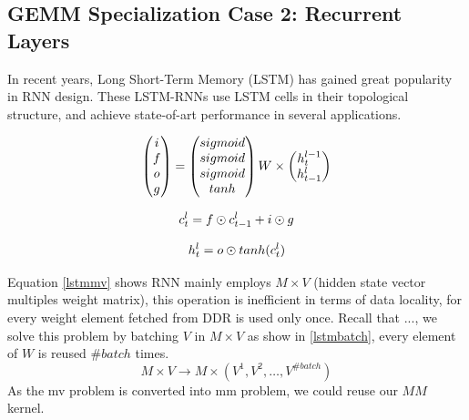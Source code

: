 \documentclass{acm_proc_article-sp-copy}
\begin{document}
\subsection{GEMM Specialization Case 2: Recurrent Layers}
In recent years, Long Short-Term Memory (LSTM) has gained great popularity in RNN design. These LSTM-RNNs use LSTM cells in their topological structure, and achieve state-of-art performance in several applications.

\begin{equation}
\centering
\begin{pmatrix}
i\\
f\\
o\\
g\\
\end{pmatrix}
=
\begin{pmatrix}
sigmoid\\
sigmoid\\
sigmoid\\
tanh   \\
\end{pmatrix}
W \times
\begin{pmatrix}
h^{l-1}_t\\
h^{l}_{t-1}\\
\end{pmatrix}
\label{lstmmv}
\end{equation}

\begin{equation}
\centering
c^l_t = f \odot c^l_{t-1} + i \odot g
\label{lstmc}
\end{equation}

\begin{equation}
\centering
h^l_t = o \odot tanh(c^l_t)
\label{lstmh}
\end{equation}

Equation \ref{lstmmv} shows RNN mainly employs $M \times V$ (hidden state vector multiples weight matrix), this operation is inefficient in terms of data locality, for every weight element fetched from DDR is used only once. Recall that ..., we solve this problem by batching $V$ in $M \times V$ as show in \ref{lstmbatch}, every element of $W$ is reused $\#batch$ times.
\[ M \times V \rightarrow M \times (V^1, V^2, \dots, V^{\#batch}) \]
As the mv problem is converted into mm problem, we could reuse our $MM$ kernel.
\end{document}

